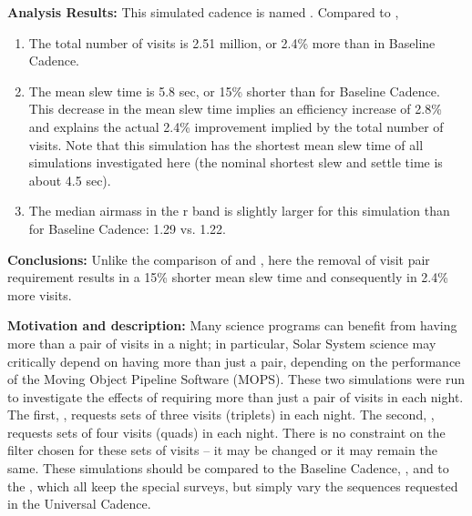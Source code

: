 {\bf Analysis Results:}  This simulated cadence is named
. Compared to ,
\begin{enumerate}
\item The total number of visits is 2.51 million, or 2.4\% more than
in Baseline Cadence.
\item The mean slew time is 5.8 sec, or 15\% shorter than for Baseline
Cadence. This decrease in the mean slew time implies an efficiency
increase of 2.8\% and explains the actual 2.4\% improvement implied by
the total number of visits.  Note that this simulation has the
shortest mean slew time of all simulations investigated here (the
nominal shortest slew and settle time is about 4.5 sec).
\item The median airmass in the r band is slightly larger for this
simulation than for Baseline Cadence: 1.29 vs. 1.22.
\end{enumerate}


{\bf Conclusions:}
Unlike the comparison of  and
, here the removal of visit pair requirement
results in a 15\% shorter mean slew time and consequently in 2.4\%
more visits.

%

{\bf Motivation and description:} Many science programs can benefit
from having more than a pair of visits in a night; in particular,
Solar System science may critically depend on having more than just a
pair, depending on the performance of the Moving Object Pipeline
Software (MOPS). These two simulations were run to investigate the
effects of requiring more than just a pair of visits in each
night. The first, , requests
sets of three visits (triplets) in each night. The second,
, requests sets of four visits (quads)
in each night. There is no constraint on the filter chosen for these
sets of visits -- it may be changed or it may remain the same. These
simulations should be compared to the Baseline Cadence,
, and to the ,
which all keep the special surveys, but simply vary the sequences
requested in the Universal Cadence. \\

